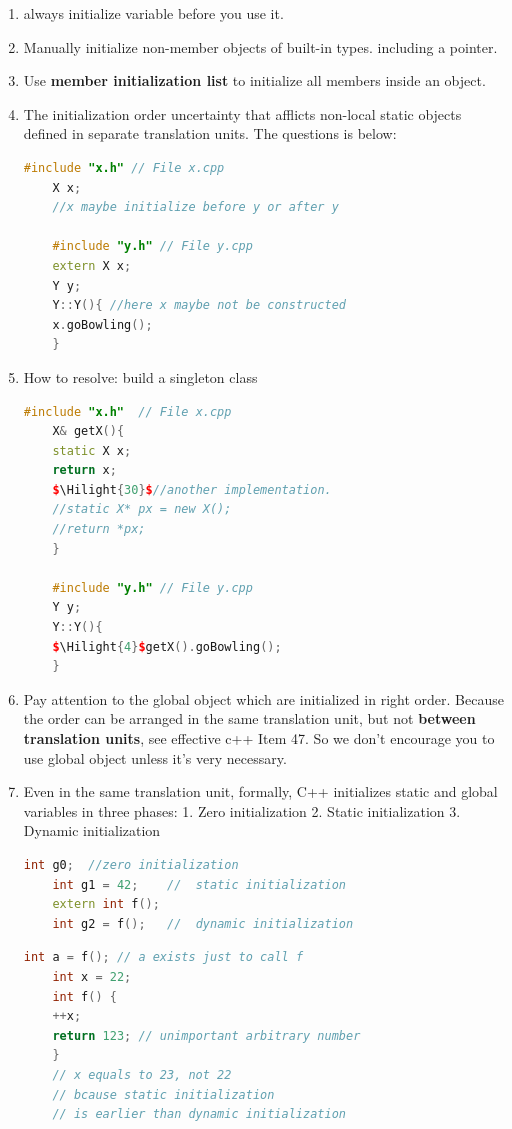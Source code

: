 \documentclass[a4paper,12pt,twoside]{book}
\newcommand{\Hilight}[1]{\makebox[0pt][l]{\color{yellow}\rule[-3pt]{#1em}{11pt}}}
\begin{document}
\begin{enumerate}
	\item always initialize variable before you use it.
	\item Manually initialize non-member objects of built-in types. including a pointer.
	\item Use \textbf{member initialization list} to initialize all members inside an object.
	
	\item The initialization order uncertainty that afflicts non-local static objects defined in separate translation units. The questions is below:
	
	\begin{lstlisting}[frame=single, language=c++]
	#include "x.h" // File x.cpp
	X x;
	//x maybe initialize before y or after y
	
	#include "y.h" // File y.cpp
	extern X x;
	Y y;
	Y::Y(){ //here x maybe not be constructed
	x.goBowling();
	}
	\end{lstlisting}
	
	\item  How to resolve: build a singleton class
	\begin{lstlisting}[frame=single, language=c++, mathescape=true]
	#include "x.h"  // File x.cpp
	X& getX(){
	static X x;
	return x;
	$\Hilight{30}$//another implementation.
	//static X* px = new X();
	//return *px;
	}
	
	#include "y.h" // File y.cpp
	Y y;
	Y::Y(){
	$\Hilight{4}$getX().goBowling();
	}
	\end{lstlisting}
	
	\item Pay attention to the global object which are initialized in right order. Because the order can be arranged in the same translation unit, but not \textbf{between translation units}, see effective c++ Item 47. So we don't encourage you to use global object unless it's very necessary.
	
	\item Even in the same translation unit, formally, C++ initializes static and global variables in three phases: 1. Zero initialization 2. Static initialization 3. Dynamic initialization
	
	\begin{lstlisting}[frame=single, language=c++, mathescape=true]
	int g0;  //zero initialization
	int g1 = 42;    //  static initialization
	extern int f();
	int g2 = f();   //  dynamic initialization
	\end{lstlisting}
	
	\begin{lstlisting}[frame=single, language=c++, mathescape=true]
	int a = f(); // a exists just to call f
	int x = 22;
	int f() {
	++x;
	return 123; // unimportant arbitrary number
	}
	// x equals to 23, not 22
	// bcause static initialization
	// is earlier than dynamic initialization
	\end{lstlisting}
	
\end{enumerate}
\end{document}
